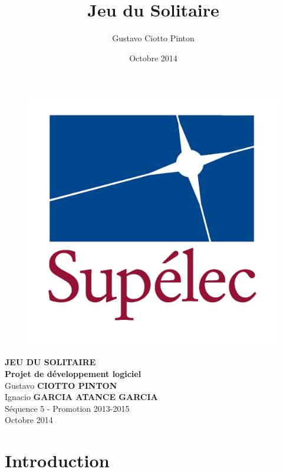 \documentclass{article}
\title{Jeu du Solitaire}
\author{Gustavo Ciotto Pinton}
\date{Octobre 2014}
\begin{document}
\begin{titlepage}
\vspace*{.18\textheight}
\begin{center}
%
\begin{figure}[h]
\centering
\includegraphics[scale=0.12]{images/LogoSupelec}
\end{figure}
%
\vspace*{10pt}
\textbf{\LARGE JEU DU SOLITAIRE} \\[0.5 cm]
\textbf{\LARGE Projet de développement logiciel }\\[1 cm]

Gustavo \textbf{CIOTTO PINTON}\\
Ignacio \textbf{GARCIA ATANCE GARCIA}\\

\vspace*{10pt}
Séquence 5 - Promotion 2013-2015\\[1 cm]

\vspace*{60pt}
Octobre 2014

\end{center}
\end{titlepage}

\newpage
\tableofcontents

\newpage
\section{Introduction}
\end{document}
